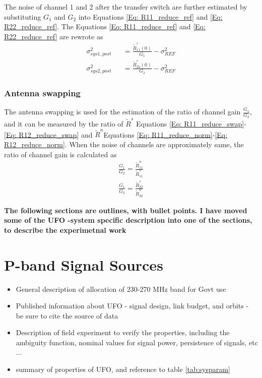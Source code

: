 \documentclass[draftcls,onecolumn]{IEEEtran}  %
\begin{document}
The noise of channel 1 and 2 after the transfer switch are further estimated by substituting $G_1$ and $G_2$ into Equations \ref{Eq: R11_reduce_ref} and \ref{Eq: R22_reduce_ref}. The Equations \ref{Eq: R11_reduce_ref} and \ref{Eq: R22_reduce_ref} are rewrote as
\begin{eqnarray}
	\sigma^2_{sys1,post} &&= \frac{\tilde{R}^r_{11}(0) }{G_1}-\sigma^2_{REF}  \label{Eq: Cal_channel_noise1} \\
    \sigma^2_{sys2,post} &&= \frac{\tilde{R}^r_{22}(0) }{G_2}-\sigma^2_{REF}  \label{Eq: Cal_channel_noise2} 
\end{eqnarray}

\subsubsection{Antenna swapping}
The antenna swapping \cite{Alejandro:2013} is used for the estimation of the ratio of channel gain $\frac{G_1}{G_2}$, and it can be measured by the ratio of $\tilde{R}^s$ Equations \ref{Eq: R11_reduce_swap}-\ref{Eq: R12_reduce_swap} and $\tilde{R}^n$Equations \ref{Eq: R11_reduce_norm}-\ref{Eq: R12_reduce_norm}. When the noise of channels are approximately same, the ratio of channel gain is calculated as
\begin{eqnarray}
	\frac{G_1}{G_2} = \frac{\tilde{R}^n_{11}}{\tilde{R}^s_{11}} \\
    \frac{G_1}{G_2} = \frac{\tilde{R}^s_{22}}{\tilde{R}^n_{22}}  \label{Eq: Cal_channel_gain_ratio}
\end{eqnarray}


\bf The following sections are outlines, with bullet points.  I have moved some of the UFO -system specific description into one of the sections, to describe the experimetnal work \rm

\section{P-band Signal Sources}
   \begin{itemize}
     \item General description of allocation of 230-270 MHz band for Govt use
     \item Published information about UFO - signal design, link budget, and orbits - be sure to cite the source of data
     \item Description of field experiment to verify the properties, including the ambiguity function, nominal values for signal power, persistence of signals, etc ... 
     \item summary of properties of UFO, and reference to table \ref{tab:sysparam}
   \end{itemize}
   
\end{document}

